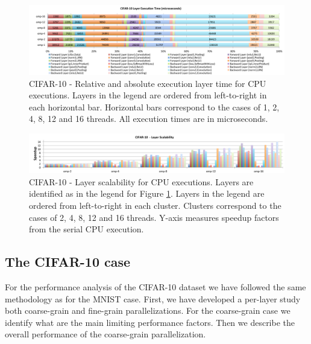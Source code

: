 \begin{figure}[]
\includegraphics[width=\textwidth]{figures/cifar-abs-rel-time.pdf}
\caption{CIFAR-10 - Relative and absolute execution layer time for CPU executions. Layers in the legend are ordered from left-to-right in each horizontal bar. Horizontal bars correspond to the cases of 1, 2, 4, 8, 12 and 16 threads. All execution times are in microseconds.}
\label{fig-cifar-abs-rel}
\end{figure}

\begin{figure}[]
\includegraphics[width=\textwidth]{figures/cifar-scalability-layer.pdf}
\caption{CIFAR-10 - Layer scalability for CPU executions. Layers are identified as in the legend for Figure \ref{fig-cifar-abs-rel}. Layers in the legend are ordered from left-to-right in each cluster. Clusters correspond to the cases of 2, 4, 8, 12 and 16 threads. Y-axis measures speedup factors from the serial CPU execution.}
\label{fig-cifar-scalability}
\end{figure}

\subsection{The CIFAR-10 case}
For the performance analysis of the CIFAR-10 dataset we have followed the 
same methodology as for the MNIST case. First, we have developed a 
per-layer study both coarse-grain and fine-grain parallelizations. 
For the coarse-grain case we identify what are the main limiting 
performance factors. Then we describe the overall performance of the 
coarse-grain parallelization. 


